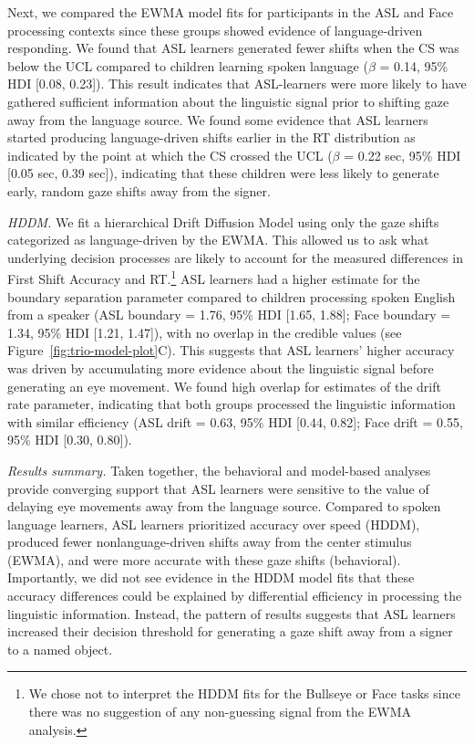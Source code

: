 \documentclass[english,floatsintext,man]{apa6}
\begin{document}
Next, we compared the EWMA model fits for participants in the ASL and
Face processing contexts since these groups showed evidence of
language-driven responding. We found that ASL learners generated fewer
shifts when the CS was below the UCL compared to children learning
spoken language (\(\beta\) = 0.14, 95\% HDI {[}0.08, 0.23{]}). This
result indicates that ASL-learners were more likely to have gathered
sufficient information about the linguistic signal prior to shifting
gaze away from the language source. We found some evidence that ASL
learners started producing language-driven shifts earlier in the RT
distribution as indicated by the point at which the CS crossed the UCL
(\(\beta\) = 0.22 sec, 95\% HDI {[}0.05 sec, 0.39 sec{]}), indicating
that these children were less likely to generate early, random gaze
shifts away from the signer.

\emph{HDDM.} We fit a hierarchical Drift Diffusion Model using only the
gaze shifts categorized as language-driven by the EWMA. This allowed us
to ask what underlying decision processes are likely to account for the
measured differences in First Shift Accuracy and RT.\footnote{We chose
  not to interpret the HDDM fits for the Bullseye or Face tasks since
  there was no suggestion of any non-guessing signal from the EWMA
  analysis.} ASL learners had a higher estimate for the boundary
separation parameter compared to children processing spoken English from
a speaker (ASL boundary = 1.76, 95\% HDI {[}1.65, 1.88{]}; Face boundary
= 1.34, 95\% HDI {[}1.21, 1.47{]}), with no overlap in the credible
values (see Figure~\ref{fig:trio-model-plot}C). This suggests that ASL
learners' higher accuracy was driven by accumulating more evidence about
the linguistic signal before generating an eye movement. We found high
overlap for estimates of the drift rate parameter, indicating that both
groups processed the linguistic information with similar efficiency (ASL
drift = 0.63, 95\% HDI {[}0.44, 0.82{]}; Face drift = 0.55, 95\% HDI
{[}0.30, 0.80{]}).

\emph{Results summary.} Taken together, the behavioral and model-based
analyses provide converging support that ASL learners were sensitive to
the value of delaying eye movements away from the language source.
Compared to spoken language learners, ASL learners prioritized accuracy
over speed (HDDM), produced fewer nonlanguage-driven shifts away from
the center stimulus (EWMA), and were more accurate with these gaze
shifts (behavioral). Importantly, we did not see evidence in the HDDM
model fits that these accuracy differences could be explained by
differential efficiency in processing the linguistic information.
Instead, the pattern of results suggests that ASL learners increased
their decision threshold for generating a gaze shift away from a signer
to a named object.
\end{document}
